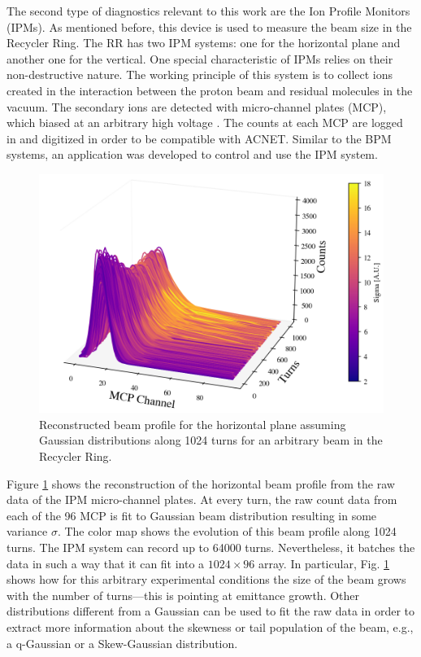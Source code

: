 The second type of diagnostics relevant to this work are the Ion Profile Monitors (IPMs). As mentioned before, this device is used to measure the beam size in the Recycler Ring. The RR has two IPM systems: one for the horizontal plane and another one for the vertical. One special characteristic of IPMs relies on their non-destructive nature. The working principle of this system is to collect ions created in the interaction between the proton beam and residual molecules in the vacuum. The secondary ions are detected with micro-channel plates (MCP), which biased at an arbitrary high voltage \cite{betiay}. The counts at each MCP are logged in and digitized in order to be compatible with ACNET. Similar to the BPM systems, an application was developed to control and use the IPM system.     

\begin{figure}[H]
   \centering
   \includegraphics[width=\columnwidth]{chapter3/ipm.png}
   \caption{Reconstructed beam profile for the horizontal plane assuming Gaussian distributions along 1024 turns for an arbitrary beam in the Recycler Ring.}
   \label{fig:ipm0}
\end{figure}

Figure \ref{fig:ipm0} shows the reconstruction of the horizontal beam profile from the raw data of the IPM micro-channel plates. At every turn, the raw count data from each of the 96 MCP is fit to Gaussian beam distribution resulting in some variance $\sigma$. The color map shows the evolution of this beam profile along 1024 turns. The IPM system can record up to 64000 turns. Nevertheless, it batches the data in such a way that it can fit into a $1024 \times 96$ array. In particular, Fig. \ref{fig:ipm0} shows how for this arbitrary experimental conditions the size of the beam grows with the number of turns---this is pointing at emittance growth. Other distributions different from a Gaussian can be used to fit the raw data in order to extract more information about the skewness or tail population of the beam, e.g., a q-Gaussian or a Skew-Gaussian distribution.

